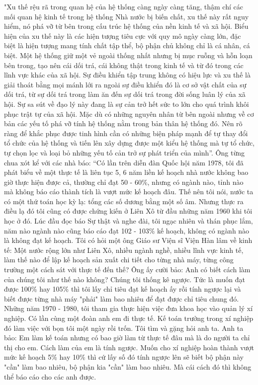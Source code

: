 "Xu thế rệu rã trong quan hệ của hệ thống càng ngày càng tăng, thậm chí các mối quan hệ kinh tế trong hệ thống Nhà nước bị biến chất, xu thế này rất nguy hiểm, nó phá vỡ từ bên trong cấu trúc hệ thống của nền kinh tế và xã hội. Biểu hiện của xu thế này là các hiện tượng tiêu cực với quy mô ngày càng lớn, đặc biệt là hiện tượng mang tính chất tập thể, bộ phận chủ không chỉ là cá nhân, cá biệt. Một hệ thống giữ một vẻ ngoài thống nhất nhưng bị mục ruỗng và hỗn loạn bên trong, tạo nên cái dối trá, cái không thật trong kinh tế và từ đó trong các lĩnh vực khác của xã hội. Sự điều khiển tập trung không có hiệu lực và xu thế là giải thoát bằng mọi mánh lới ra ngoài sự điều khiển đó là cơ sở vật chất của sự dối trá, từ sự dối trá trong làm ăn đến sự dối trá trong đời sống luân lý của xã hội. Sự sa sút về đạo lý này đang là sự cản trở hết sức to lớn cho quá trình khôi phục trật tự của xã hội. Mặc dù có những nguyên nhân từ bên ngoài nhưng về cơ bản các yếu tố phá vỡ tính hệ thống nằm trong bản thân hệ thống đó. Nên rõ ràng để khắc phục được tinh hình cần có những biện pháp mạnh để tự thay đổi tổ chức của hệ thống và tiến lên xây dựng được một kiểu hệ thống mà tự tổ chức, tự chọn lọc và loại bỏ những yếu tố cản trở sự phát triển của mình”. 
Ông từng chua xót kể với các nhà báo:
“Có lần trên diễn đàn Quốc hội năm 1978, tôi đã phát biểu về một thực tế là liên tục 5, 6 năm liền kế hoạch nhà nước không bao giờ thực hiện được cả, thường chỉ đạt 50 - 60\%, nhưng có ngành nào, tỉnh nào mà không báo cáo thành tích là vượt mức kế hoạch đâu. Thế nên tôi nói, nước ta có một thứ toán học kỳ lạ: tổng các số dương bằng một số âm. Nhưng thực ra điều lạ đó tôi cũng có được chứng kiến ở Liên Xô từ đầu những năm 1960 khi tôi học ở đó. Lúc đầu đọc báo Sự thật và nghe đài, tôi ngạc nhiên và thán phục lắm, năm nào ngành nào cũng báo cáo đạt 102 - 103\% kế hoạch, không có ngành nào là không đạt kế hoạch. Tôi có hỏi một ông Giáo sư Viện sĩ Viện Hàn lâm về kinh tế: Một nước rộng lớn như Liên Xô, nhiều ngành nghề, nhiều lĩnh vực kinh tế, làm thế nào để lập kế hoạch sản xuất chi tiết cho từng nhà máy, từng công trường một cách sát với thực tế đến thế? Ông ấy cười bảo: Anh có biết cách làm của chúng tôi như thế nào không? Chúng tôi thống kê ngược. Tức là muốn đạt được 100\% hay 105\% thì tôi lấy chỉ tiêu đạt kế hoạch ấy rồi tính ngược lại và biết được từng nhà máy "phải" làm bao nhiêu để đạt được chỉ tiêu chung đó. 
Những năm 1970 - 1980, tôi tham gia thực hiện việc đưa khoa học vào quản lý xí nghiệp. Có lần cùng một đoàn anh em đi thực tế. Kế toán trưởng trong xí nghiệp đó làm việc với bọn tôi một ngày rồi trốn. Tôi tìm và gặng hỏi anh ta. Anh ta bảo: Em làm kế toán nhưng có bao giờ làm từ thực tế đâu mà là do người ta chỉ thị cho em. Cách làm của em là tính ngược. Muốn cho xí nghiệp hoàn thành vượt mức kế hoạch 5\% hay 10\% thì cứ lấy số đó tính ngược lên sẽ biết bộ phận này "cần" làm bao nhiêu, bộ phận kia "cần" làm bao nhiêu. Mà cái cách đó thì không thể báo cáo cho các anh được.

